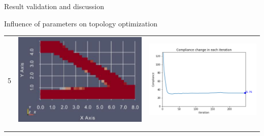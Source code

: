 \documentclass[a4paper,12pt,times]{article}
\begin{document}
\begin{section}{Result validation and discussion}
\begin{subsection}{Influence of parameters on topology optimization}
\begin{center}
\begin{table} [H]
\begin{tabular}{c|c|c}
5&\includegraphics[scale = 0.5]{rmin_5.png} & \includegraphics[scale = 0.4]{MMA_ComplianceVSiteration_rmin_5.png}\\ 
\\\hline\\ 

\end{tabular}
\end{table}
\end{center}
\end{subsection}
\end{section}
\end{document}
